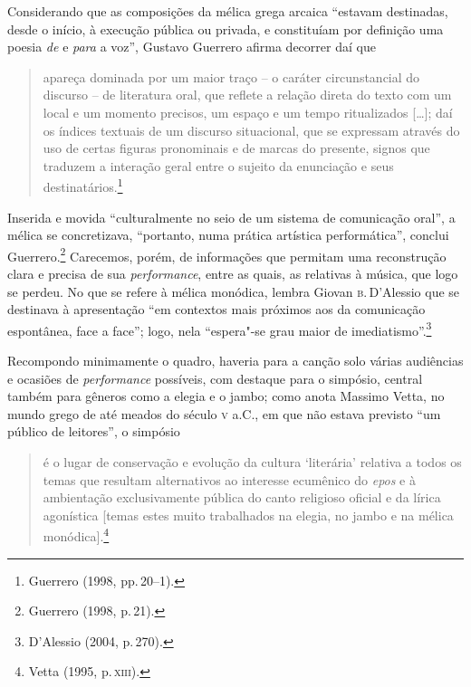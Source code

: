 Considerando que as composições da mélica grega arcaica “estavam destinadas,
desde o início, à execução pública ou privada, e constituíam por definição uma
poesia \textit{de} e \textit{para} a voz”, Gustavo Guerrero
afirma decorrer daí que

\begin{quote}
apareça dominada por um maior traço -- o caráter circunstancial do discurso -- de
literatura oral, que reflete a relação direta do texto com um local e um
momento precisos, um espaço e um tempo ritualizados {[}\ldots{}{]}; daí os índices
textuais de um discurso situacional, que se expressam através do uso de certas
figuras pronominais e de marcas do presente, signos que traduzem a interação
geral entre o sujeito da enunciação e seus destinatários.\footnote{ Guerrero (1998, pp.\,20--1).}
\end{quote}

Inserida e movida “culturalmente no seio de um sistema de comunicação oral”, a
mélica se concretizava, “portanto, numa prática artística performática”,
conclui Guerrero.\footnote{ Guerrero (1998, p.\,21).} Carecemos, porém, de informações que permitam uma
reconstrução clara e precisa de sua \textit{performance}, entre as quais, as
relativas à música, que logo se perdeu. No que se refere à mélica monódica,
lembra Giovan \textsc{b}.\,D’Alessio que se destinava à apresentação “em
contextos mais próximos aos da comunicação espontânea, face a face”; logo, nela
“espera"-se grau maior de imediatismo”.\footnote{ D’Alessio (2004, p.\,270).} 

Recompondo minimamente o quadro, haveria para a canção solo várias audiências e
ocasiões de \textit{performance} possíveis, com destaque para o simpósio,
central também para gêneros como a elegia e o jambo; como anota Massimo Vetta,
no mundo grego de até meados do século \textsc{v} a.C., em que não
estava previsto “um público de leitores”, o simpósio 

\begin{quote}
é o lugar de conservação
e evolução da cultura ‘literária’ relativa a todos os temas que resultam
alternativos ao interesse ecumênico do \textit{epos} e à ambientação
exclusivamente pública do canto religioso oficial e da lírica agonística
{[}temas estes muito trabalhados na elegia, no jambo e na mélica monódica{]}.\footnote{ Vetta (1995, p.\,\textsc{xiii}).}
\end{quote}

